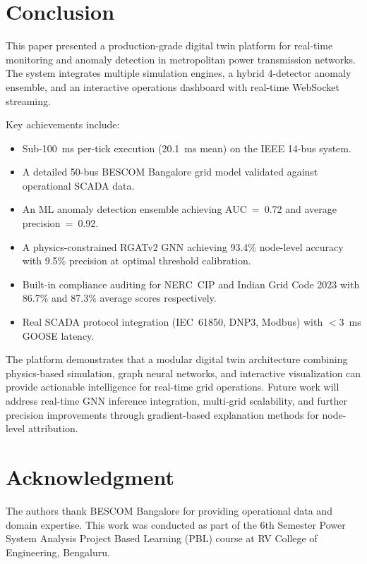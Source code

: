 \documentclass[conference]{IEEEtran}
\begin{document}
\section{Conclusion}
\label{sec:conclusion}

This paper presented a production-grade digital twin platform for real-time monitoring and anomaly detection in metropolitan power transmission networks. The system integrates multiple simulation engines, a hybrid 4-detector anomaly ensemble, and an interactive operations dashboard with real-time WebSocket streaming.

Key achievements include:

\begin{itemize}
  \item Sub-100~ms per-tick execution (20.1~ms mean) on the IEEE 14-bus system.
  \item A detailed 50-bus BESCOM Bangalore grid model validated against operational SCADA data.
  \item An ML anomaly detection ensemble achieving AUC~=~0.72 and average precision~=~0.92.
  \item A physics-constrained RGATv2 GNN achieving 93.4\% node-level accuracy with 9.5\% precision at optimal threshold calibration.
  \item Built-in compliance auditing for NERC~CIP and Indian Grid Code 2023 with 86.7\% and 87.3\% average scores respectively.
  \item Real SCADA protocol integration (IEC~61850, DNP3, Modbus) with $< 3$~ms GOOSE latency.
\end{itemize}

The platform demonstrates that a modular digital twin architecture combining physics-based simulation, graph neural networks, and interactive visualization can provide actionable intelligence for real-time grid operations. Future work will address real-time GNN inference integration, multi-grid scalability, and further precision improvements through gradient-based explanation methods for node-level attribution.

\section*{Acknowledgment}
The authors thank BESCOM Bangalore for providing operational data and domain expertise. This work was conducted as part of the 6th Semester Power System Analysis Project Based Learning (PBL) course at RV College of Engineering, Bengaluru.
\end{document}
